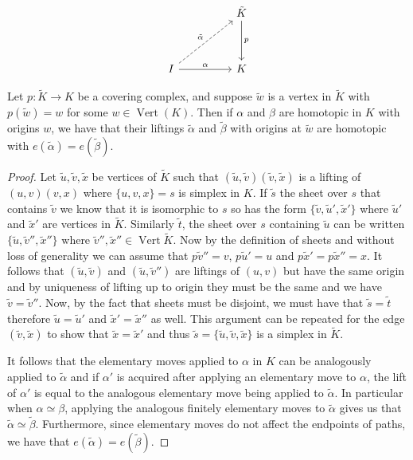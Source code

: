 \begin{equation*}
    \begin{tikzcd}[ampersand replacement=\&, sep=huge]
      \& \tilde{K} \arrow[d,"p"] \\
    I \arrow[ur,dashrightarrow,"\tilde{\alpha}"] \arrow[r,"\alpha"] \& K
  \end{tikzcd}
\end{equation*}

\begin{lemma}
  \label{lem:lift-homo}
  Let $p:\tilde{K} \rightarrow K$ be a covering complex, and suppose $\tilde{w}$ is a vertex in $\tilde{K}$ with $p(\tilde{w}) = w $ for some $w \in \operatorname{Vert}(K)$. Then if $\alpha$ and $\beta$ are homotopic in $K$ with origins $w$, we have that their liftings $\tilde{\alpha}$ and $\tilde{\beta}$ with origins at $\tilde{w}$ are homotopic with $e(\tilde{\alpha}) = e(\tilde{\beta})$.
\end{lemma}

\begin{proof}
  Let $\tilde{u},\tilde{v},\tilde{x}$ be vertices of $\tilde{K}$ such that $(\tilde{u},\tilde{v})(\tilde{v},\tilde{x})$ is a lifting of $(u,v)(v,x)$ where $\{u,v,x\} = s$ is  simplex in $K$. If $\tilde{s}$ the sheet over $s$ that contains $\tilde{v}$ we know that it is isomorphic to $s$ so has the form $\{\tilde{v}, \tilde{u}', \tilde{x}' \}$ where $\tilde{u}'$ and $\tilde{x}'$ are vertices in $\tilde{K}$. Similarly $\tilde{t}$, the sheet over $s$ containing $\tilde{u}$ can be written $\{\tilde{u},\tilde{v}'',\tilde{x}''\}$ where $\tilde{v}'',\tilde{x}'' \in \operatorname{Vert}{\tilde{K}}$. Now by the definition of sheets and without loss of generality we can assume that $p\tilde{v}'' = v$, $p\tilde{u}' = u$ and $p\tilde{x}' = p\tilde{x}'' = x$. It follows that $(\tilde{u},\tilde{v})$ and $(\tilde{u},\tilde{v}'')$ are liftings of $(u,v)$ but have the same origin and by uniqueness of lifting up to origin they must be the same and we have $\tilde{v} = \tilde{v}''$. Now, by the fact that sheets must be disjoint, we must have that $\tilde{s} = \tilde{t}$ therefore $\tilde{u} = \tilde{u}'$ and $\tilde{x}' = \tilde{x}''$ as well. This argument can be repeated for the edge $(\tilde{v},\tilde{x})$ to show that $\tilde{x} = \tilde{x}'$ and thus $\tilde{s} = \{\tilde{u},\tilde{v},\tilde{x}\}$ is a simplex in $\tilde{K}$.

  It follows that the elementary moves applied to $\alpha$ in $K$ can be analogously applied to $\tilde{\alpha}$ and if $\alpha'$ is acquired after applying an elementary move to $\alpha$, the lift of $\alpha'$ is equal to the analogous elementary move being applied to $\tilde{\alpha}$. In particular when $\alpha \simeq \beta$, applying the analogous finitely elementary moves to $\tilde{\alpha}$ gives us that $\tilde{\alpha} \simeq \tilde{\beta}$. Furthermore, since elementary moves do not affect the endpoints of paths, we have that $e(\tilde{\alpha}) = e(\tilde{\beta})$.
\end{proof}

